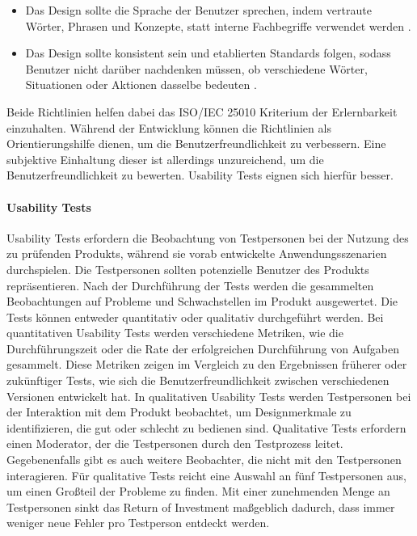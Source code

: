 \begin{itemize}
    \item Das Design sollte die Sprache der Benutzer sprechen, indem vertraute Wörter, Phrasen und Konzepte, statt interne Fachbegriffe verwendet werden \cite[Regel 2]{Nielsen.1994}.
    \item Das Design sollte konsistent sein und etablierten Standards folgen, sodass Benutzer nicht darüber nachdenken müssen, ob verschiedene Wörter, Situationen oder Aktionen dasselbe bedeuten \cite[Regel 4]{Nielsen.1994}.
\end{itemize}

Beide Richtlinien helfen dabei das ISO/IEC 25010 Kriterium der Erlernbarkeit einzuhalten. Während der Entwicklung können die Richtlinien als Orientierungshilfe dienen, um die Benutzerfreundlichkeit zu verbessern. Eine subjektive Einhaltung dieser ist allerdings unzureichend, um die Benutzerfreundlichkeit zu bewerten. Usability Tests eignen sich hierfür besser.

\paragraph{Usability Tests}
Usability Tests erfordern die Beobachtung von Testpersonen bei der Nutzung des zu prüfenden Produkts, während sie vorab entwickelte Anwendungsszenarien durchspielen. Die Testpersonen sollten potenzielle Benutzer des Produkts repräsentieren.\cite[S.~22]{Dumas.1999} Nach der Durchführung der Tests werden die gesammelten Beobachtungen auf Probleme und Schwachstellen im Produkt ausgewertet. Die Tests können entweder quantitativ oder qualitativ durchgeführt werden. Bei quantitativen Usability Tests werden verschiedene Metriken, wie die Durchführungszeit oder die Rate der erfolgreichen Durchführung von Aufgaben gesammelt. Diese Metriken zeigen im Vergleich zu den Ergebnissen früherer oder zukünftiger Tests, wie sich die Benutzerfreundlichkeit zwischen verschiedenen Versionen entwickelt hat. In qualitativen Usability Tests werden Testpersonen bei der Interaktion mit dem Produkt beobachtet, um Designmerkmale zu identifizieren, die gut oder schlecht zu bedienen sind.\cite{Budiu.2017} Qualitative Tests erfordern einen Moderator, der die Testpersonen durch den Testprozess leitet. Gegebenenfalls gibt es auch weitere Beobachter, die nicht mit den Testpersonen interagieren.\cite{Moran.2019} Für qualitative Tests reicht eine Auswahl an fünf Testpersonen aus, um einen Großteil der Probleme zu finden. Mit einer zunehmenden Menge an Testpersonen sinkt das Return of Investment maßgeblich dadurch, dass immer weniger neue Fehler pro Testperson entdeckt werden.\cite{Nielsen.2012}

